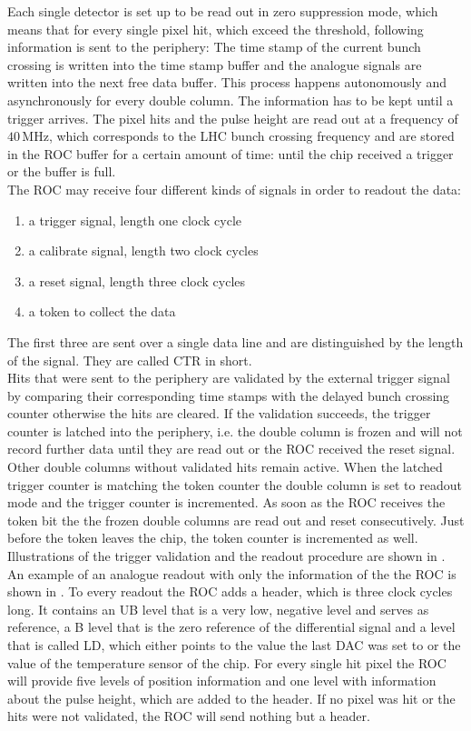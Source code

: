 \documentclass[british,11pt,a4paper]{memoir}
\begin{document}
Each single detector is set up to be read out in zero suppression mode, which means that for every single pixel hit, which exceed the threshold, following information is sent to the periphery: The time stamp of the current bunch crossing is written into the time stamp buffer and the analogue signals are written into the next free data buffer. This process happens autonomously and asynchronously for every double column. The information has to be kept until a trigger arrives. The pixel hits and the pulse height are read out at a frequency of $40\,$MHz, which corresponds to the \ac{LHC} bunch crossing frequency and are stored in the \ac{ROC} buffer for a certain amount of time: until the chip received a trigger or the buffer is full.\\
The \ac{ROC} may receive four different kinds of signals in order to readout the data:
\begin{enumerate}
	\item a trigger signal, length one clock cycle
	\item a calibrate signal, length two clock cycles
	\item a reset signal, length three clock cycles
	\item a token to collect the data
\end{enumerate}
The first three are sent over a single data line and are distinguished by the length of the signal. They are called \ac{CTR} in short.\\
Hits that were sent to the periphery are validated by the external trigger signal by comparing their corresponding time stamps with the delayed bunch crossing counter otherwise the hits are cleared. If the validation succeeds, the trigger counter is latched into the periphery, i.e. the double column is frozen and will not record further data until they are read out or the \ac{ROC} received the reset signal. Other double columns without validated hits remain active. When the latched trigger counter is matching the token counter the double column is set to readout mode and the trigger counter is incremented. As soon as the \ac{ROC} receives the token bit the the frozen double columns are read out and reset consecutively. Just before the token leaves the chip, the token counter is incremented as well. Illustrations of the trigger validation and the readout procedure are shown in . \\
An example of an analogue readout with only the information of the the \ac{ROC} is shown in . To every readout the \ac{ROC} adds a header, which is three clock cycles long. It contains an \ac{UB} level that is a very low, negative level and serves as reference, a \ac{B} level that is the zero reference of the differential signal and a level that is called \ac{LD}, which either points to the value the last \ac{DAC} was set to or the value of the temperature sensor of the chip. For every single hit pixel the \ac{ROC} will provide five levels of position information and one level with information about the pulse height, which are added to the header. If no pixel was hit or the hits were not validated, the \ac{ROC} will send nothing but a header.\\
\end{document}
